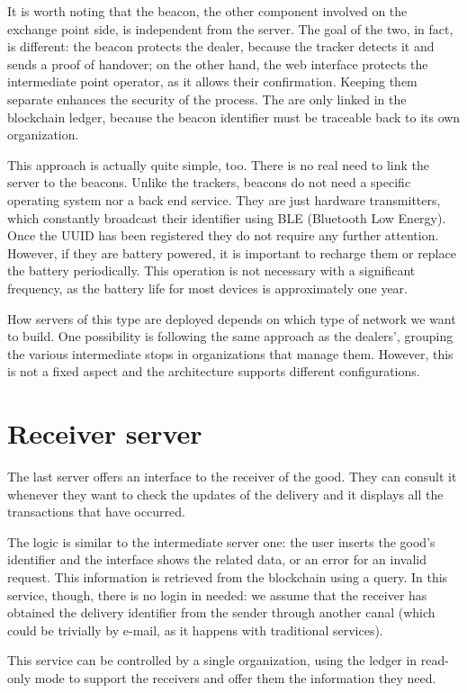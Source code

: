 It is worth noting that the beacon, the other component involved on the exchange point side, is independent from the server. The goal of the two, in fact, is different: the beacon protects the dealer, because the tracker detects it and sends a proof of handover; on the other hand, the web interface protects the intermediate point operator, as it allows their confirmation. Keeping them separate enhances the security of the process. The are only linked in the blockchain ledger, because the beacon identifier must be traceable back to its own organization. 

This approach is actually quite simple, too. There is no real need to link the server to the beacons. Unlike the trackers, beacons do not need a specific operating system nor a back end service. They are just hardware transmitters, which constantly broadcast their identifier using BLE (Bluetooth Low Energy). Once the UUID has been registered they do not require any further attention. However, if they are battery powered, it is important to recharge them or replace the battery periodically. This operation is not necessary with a significant frequency, as the battery life for most devices is approximately one year.

How servers of this type are deployed depends on which type of network we want to build. One possibility is following the same approach as the dealers', grouping the various intermediate stops in organizations that manage them. However, this is not a fixed aspect and the architecture supports different configurations.

\section{Receiver server}
The last server offers an interface to the receiver of the good. They can consult it whenever they want to check the updates of the delivery and it displays all the transactions that have occurred. 

The logic is similar to the intermediate server one: the user inserts the good's identifier and the interface shows the related data, or an error for an invalid request. This information is retrieved from the blockchain using a query. In this service, though, there is no login in needed: we assume that the receiver has obtained the delivery identifier from the sender through another canal (which could be trivially by e-mail, as it happens with traditional services).

This service can be controlled by a single organization, using the ledger in read-only mode to support the receivers and offer them the information they need. 

